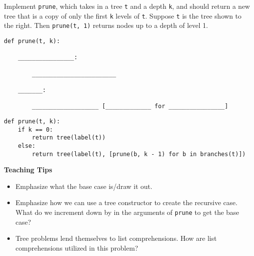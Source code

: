\begin{blocksection}
\question Implement \lstinline$prune$, which takes in a tree \lstinline$t$ and a depth
\lstinline$k$, and should return a new tree that is a copy of only the first \lstinline$k$
levels of \lstinline$t$. Suppose \lstinline$t$ is the tree shown to the right. Then
\lstinline$prune(t, 1)$ returns nodes up to a depth of level 1.
\begin{lstlisting}
def prune(t, k):

    ________________:

        ________________________
    
    _______:

        ___________________ [_____________ for ________________]

\end{lstlisting}

\begin{solution}[1in]
\begin{lstlisting}
def prune(t, k):
    if k == 0:
        return tree(label(t))
    else:
        return tree(label(t), [prune(b, k - 1) for b in branches(t)])
\end{lstlisting}
\end{solution}
\end{blocksection}

\begin{guide}
    \begin{blocksection}
    \textbf{Teaching Tips}
    \begin{itemize}
        \item Emphasize what the base case is/draw it out.
        \item Emphasize how we can use a tree constructor to create the recursive case. What do we increment down by in the arguments of \lstinline$prune$ to get the base case?
        \item Tree problems lend themselves to list comprehensions. How are list comprehensions utilized in this problem?
    \end{itemize}
    \end{blocksection}
\end{guide}